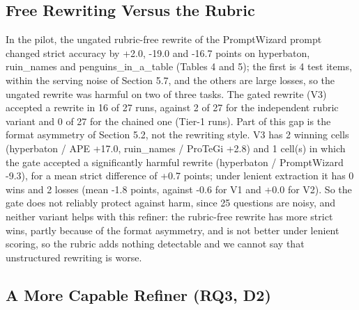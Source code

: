 \documentclass{ieeeaccess}
\begin{document}
\subsection{Free Rewriting Versus the Rubric}

In the pilot, the ungated rubric-free rewrite of the PromptWizard prompt changed strict accuracy by +2.0, -19.0 and -16.7 points on hyperbaton, ruin\_\allowbreak{}names and penguins\_\allowbreak{}in\_\allowbreak{}a\_\allowbreak{}table (Tables 4 and 5); the first is 4 test items, within the serving noise of Section 5.7, and the others are large losses, so the ungated rewrite was harmful on two of three tasks. The gated rewrite (V3) accepted a rewrite in 16 of 27 runs, against 2 of 27 for the independent rubric variant and 0 of 27 for the chained one (Tier-1 runs). Part of this gap is the format asymmetry of Section 5.2, not the rewriting style. V3 has 2 winning cells (hyperbaton / APE +17.0, ruin\_\allowbreak{}names / ProTeGi +2.8) and 1 cell(s) in which the gate accepted a significantly harmful rewrite (hyperbaton / PromptWizard -9.3), for a mean strict difference of +0.7 points; under lenient extraction it has 0 wins and 2 losses (mean -1.8 points, against -0.6 for V1 and +0.0 for V2). So the gate does not reliably protect against harm, since 25 questions are noisy, and neither variant helps with this refiner: the rubric-free rewrite has more strict wins, partly because of the format asymmetry, and is not better under lenient scoring, so the rubric adds nothing detectable and we cannot say that unstructured rewriting is worse.

\subsection{A More Capable Refiner (RQ3, D2)}
\end{document}
